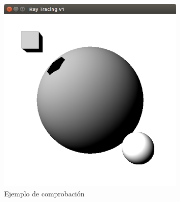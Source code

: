 \begin{figure}[h]
	\begin{center}
		\includegraphics[width=0.8\textwidth]{imagenes/prueba.png}
	\end{center}
	\caption{Ejemplo de comprobación}
	\label{fig:etiq_9}
\end{figure}


